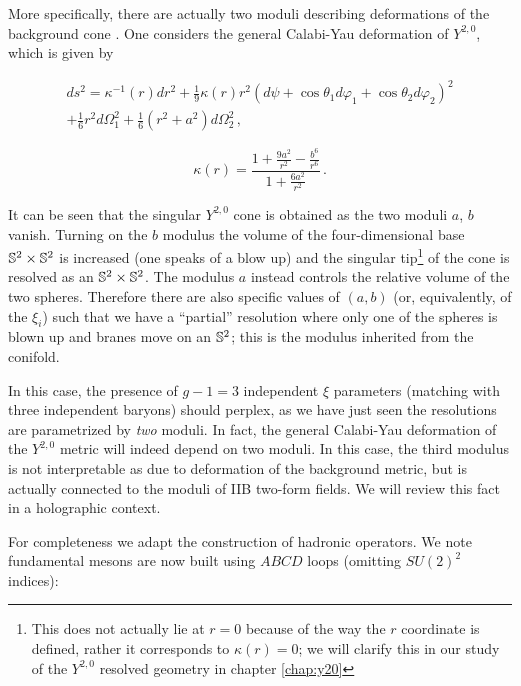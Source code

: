 More specifically, there are actually two moduli describing deformations of the background cone \cite{Benvenutifourcycles}. One considers the general Calabi-Yau deformation of $Y^{2,0}$, which is given by \cite{PandoZayasy20}

\begin{equation}
	\begin{split}
	ds^2 = \kappa^{-1}(r) dr^2 + \frac{1}{9} \kappa(r) r^2 \left( d\psi + \cos\theta_1 d\varphi_1 + \cos\theta_2 d\varphi_2 \right)^2 \\
	+ \frac{1}{6} r^2 d\Omega_1^2 + \frac{1}{6}(r^2 + a^2) d\Omega_2^2\,,
	\label{genCYy20cones}
\end{split}
\end{equation}

\begin{equation}
	\kappa(r) = \frac{1 + \frac{9a^2}{r^2} - \frac{b^6}{r^6}}{1 + \frac{6a^2}{r^2}}\,.
	\label{}
\end{equation}

It can be seen that the singular $Y^{2,0}$ cone is obtained as the two moduli $a$, $b$ vanish. Turning on the $b$ modulus the volume of the four-dimensional base $\mathbb{S}^2\times \mathbb{S}^2$ is increased (one speaks of a blow up) and the singular tip\footnote{This does not actually lie at $r=0$ because of the way the $r$ coordinate is defined, rather it corresponds to $\kappa(r) = 0$; we will clarify this in our study of the $Y^{2,0}$ resolved geometry in chapter \ref{chap:y20}} of the cone is resolved as an $\mathbb{S}^2 \times \mathbb{S}^2$. The modulus $a$ instead controls the relative volume of the two spheres. Therefore there are also specific values of $(a,b)$ (or, equivalently, of the $\xi_i$) such that we have a ``partial'' resolution where only one of the spheres is blown up and branes move on an $\mathbb{S}^2$; this is the modulus inherited from the conifold.

In this case, the presence of $g-1 = 3$ independent $\xi$ parameters (matching with three independent baryons) should perplex, as we have just seen the resolutions are parametrized by \emph{two} moduli. In fact, the general Calabi-Yau deformation of the $Y^{2,0}$ metric will indeed depend on two moduli. In this case, the third modulus is not interpretable as due to deformation of the background metric, but is actually connected to the moduli of IIB two-form fields. We will review this fact in a holographic context.

For completeness we adapt the construction of hadronic operators. We note fundamental mesons are now built using $ABCD$ loops (omitting $SU(2)^2$ indices):

